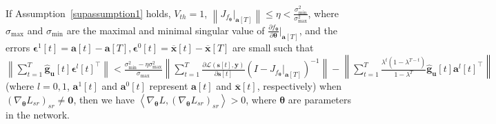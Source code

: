 \documentclass{article}
\begin{document}
\begin{supthm}\label{supthm_recurrent}
If Assumption~\ref{supassumption1} holds, $V_{th}=1$, $\left\lVert J_{f_{\bm{\theta}}}\vert_{\mathbf{a}[T]} \right\rVert \leq \eta < \frac{\sigma_{\text{min}}^2}{\sigma_{\text{max}}^2}$, where $\sigma_{\text{max}}$ and $\sigma_{\text{min}}$ are the maximal and minimal singular value of $\frac{\partial f_{\bm{\theta}}}{\partial \bm{\theta}}\vert_{\mathbf{a}[T]}$, and the errors $\bm{\epsilon}^1[t]=\mathbf{a}[t]-\mathbf{a}[T], \bm{\epsilon}^0[t]=\overline{\mathbf{x}}[t]-\overline{\mathbf{x}}[T]$ are small such that $\left\lVert \sum_{t=1}^T \hat{\mathbf{g}}_{\mathbf{u}}[t] {\bm{\epsilon}^l[t]}^\top  \right\rVert < \frac{\sigma_{\text{min}}^2-\eta \sigma_{\text{max}}^2}{\sigma_{\text{max}}}\left\lVert \sum_{t=1}^T \frac{\partial \mathcal{L}(\mathbf{s}[t], \mathbf{y})}{\partial \mathbf{s}[t]} \left(I-J_{f_{\bm{\theta}}}\vert_{\mathbf{a}[T]}\right)^{-1} \right\rVert - \left\lVert \sum_{t=1}^T \frac{\lambda^t(1-\lambda^{T-t})}{1-\lambda^T}\hat{\mathbf{g}}_{\mathbf{u}}[t] {\mathbf{a}^l[t]}^\top  \right\rVert$ (where $l=0,1$, $\mathbf{a}^1[t]$ and $\mathbf{a}^0[t]$ represent $\mathbf{a}[t]$ and $\overline{\mathbf{x}}[t]$, respectively) when $\left(\nabla_{\bm{\theta}}L_{sr}\right)_{sr}\neq\mathbf{0}$, then we have $\left<\nabla_{\bm{\theta}}L, \left(\nabla_{\bm{\theta}}L_{sr}\right)_{sr}\right> > 0$, where $\bm{\theta}$ are parameters in the network.
\end{supthm}
\end{document}
